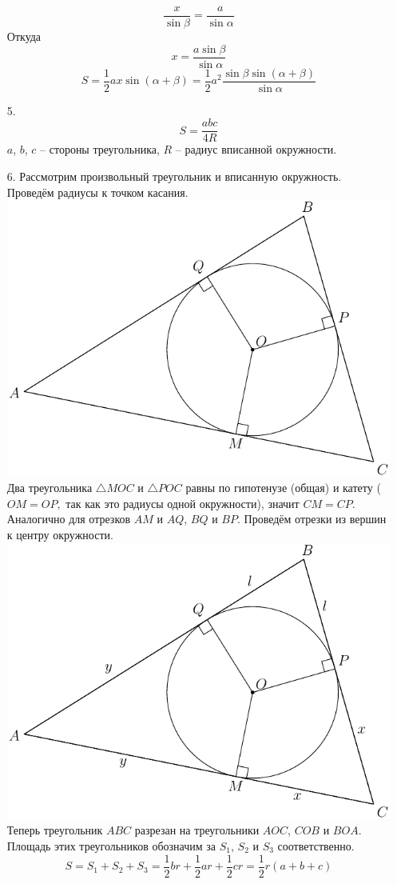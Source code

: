 \documentclass[titlepage]{article}
\begin{document}
\begin{itemize}
            $$\frac{x}{\sin \beta}=\frac{a}{\sin \alpha}$$
            Откуда 
            $$ x = \frac{a \sin \beta}{\sin \alpha} $$ 
            $$ \boxed{S = \frac{1}{2}ax\sin (\alpha+\beta)=\frac{1}{2}a^2\frac{\sin \beta \sin (\alpha + \beta)}{\sin \alpha}} $$
        \item[5.] $$ S = \frac{abc}{4R} $$   
        $a$, $b$, $c$ -- стороны треугольника, $R$ -- радиус вписанной окружности.
        \item[6.] Рассмотрим произвольный треугольник и вписанную окружность. Проведём радиусы к точком касания. \newline
        \includegraphics{incirc_1.pdf}
        \newline
        Два треугольника $\triangle MOC$ и $\triangle POC$ равны по гипотенузе (общая) и катету ($OM=OP,$ так как это радиусы одной окружности), значит $CM=CP$.
        Аналогично для отрезков $AM$ и  $AQ$, $BQ$ и $BP$.
        Проведём отрезки из вершин к центру окружности.\newline 
        \includegraphics{incirc_2.pdf}\\        
        \setlength{\unitlength}{1cm}
        Теперь треугольник $ABC$ разрезан на треугольники $AOC$, $COB$ и $BOA$.
        Площадь этих треугольников обозначим за $S_1$, $S_2$ и $S_3$ соответственно.   
        $$\boxed{ S = S_1+S_2+S_3 = \frac{1}{2}br+\frac{1}{2}ar+\frac{1}{2}cr=
        \frac{1}{2}r(a+b+c)}$$
        

\end{itemize}
\end{document}
